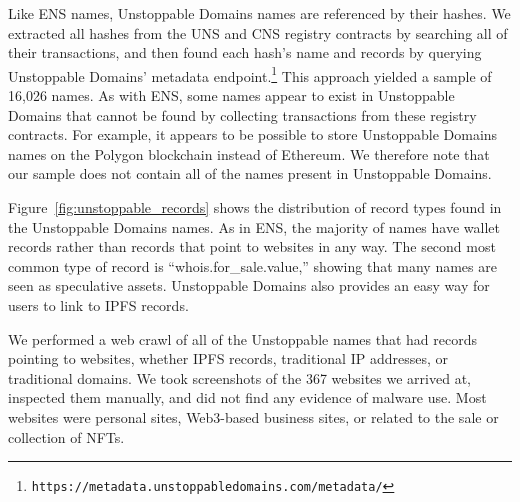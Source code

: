 Like ENS names, Unstoppable Domains names are referenced by their hashes. We 
extracted all hashes from the UNS and CNS registry contracts 
by searching all of their transactions, and then found each 
hash's name and records by querying Unstoppable Domains' 
metadata endpoint.\footnote{	
\texttt{https://metadata.unstoppabledomains.com/metadata/}} 
This approach yielded a sample of 16,026 names. As with ENS, 
some names appear to exist in Unstoppable Domains that cannot 
be found by collecting transactions from these registry 
contracts. For example, it appears to be possible to store Unstoppable Domains 
names on the Polygon blockchain instead of Ethereum. We therefore note that our 
sample does not contain all of the names present in Unstoppable Domains.

Figure~\ref{fig:unstoppable_records} shows the distribution 
of record types found in the Unstoppable Domains names. As in 
ENS, the majority of names have wallet records rather than 
records that point to websites in any way. The second most common 
type of record is ``whois.for\_sale.value,'' showing that many 
names are seen as speculative assets. Unstoppable Domains also 
provides an easy way for users to link to IPFS records.

We performed a web crawl of all of the Unstoppable names that 
had records pointing to websites, whether IPFS records, 
traditional IP addresses, or traditional domains. We took 
screenshots of the 367 websites we arrived 
at, inspected them manually, and did not find any evidence of 
malware use. Most 
websites were personal sites, Web3-based business sites, or related to the sale 
or collection of NFTs. 




